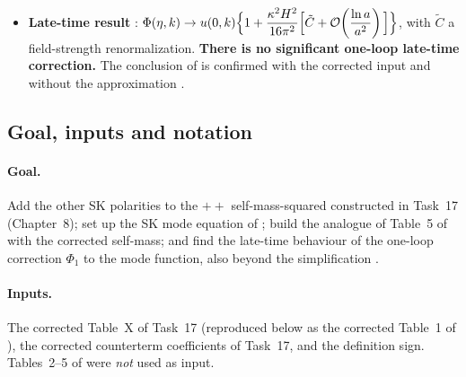 \begin{resultbox}
\begin{itemize}[leftmargin=12pt,itemsep=2pt]
$\tfrac4{45}\khat^4/a,\ \tfrac4{175}\khat^6/a,\dots$ left by the printed row, so that the corrected right-hand side falls like $\ln a/a^2$
(with the printed row it would fall like $\khat^4/a$).
$72\gamma_2$: identically no effect. Finite parts of $\beta_{2,3}$: absorbed into $\Delta\alpha_{2,3}$; the only local effect, $-\Delta\alpha_3H^2k^2u/a^2$, falls off.
\item \textbf{Late-time result} \tD:
$\displaystyle \Phi(\eta,k)\to u(0,k)\Big\{1+\frac{\kappa^2H^2}{16\pi^2}\Big[\tilde C+\mathcal{O}\!\left(\frac{\ln a}{a^2}\right)\Big]\Big\}$,
with $\tilde C$ a field-strength renormalization. \textbf{There is no significant one-loop late-time correction.}
The conclusion of \PII{} is confirmed with the corrected input and without the approximation .
\end{itemize}
\end{resultbox}

\subsection{Goal, inputs and notation}
\label{sec:t18-goal}

\paragraph{Goal.}
Add the other SK polarities to the $++$ self-mass-squared constructed in Task~17 (Chapter~8); set up the SK mode equation of \PII;
build the analogue of Table~5 of \PII{} with the corrected self-mass; and find the late-time behaviour of the one-loop correction
$\Phi_1$ to the mode function, also beyond the simplification .

\paragraph{Inputs.}
The corrected Table~X of Task~17 (reproduced below as the corrected Table~1 of \PII), the corrected counterterm coefficients of Task~17,
and the definition sign. Tables~2--5 of \PII{} were \emph{not} used as input.

